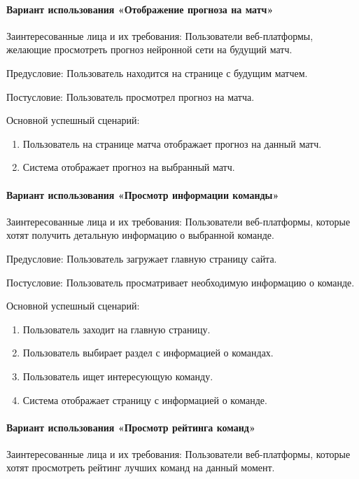 \paragraph{Вариант использования «Отображение прогноза на матч»}

Заинтересованные лица и их требования: Пользователи веб-платформы, желающие просмотреть прогноз нейронной сети на будущий матч.

Предусловие: Пользователь находится на странице с будущим матчем.

Постусловие: Пользователь просмотрел прогноз на матча.

Основной успешный сценарий:
\begin{enumerate}
	\item Пользователь на странице матча отображает прогноз на данный матч.
	\item Система отображает прогноз на выбранный матч.
\end{enumerate}

\paragraph{Вариант использования «Просмотр информации команды»}

Заинтересованные лица и их требования: Пользователи веб-платформы, которые хотят получить детальную информацию о выбранной команде.

Предусловие: Пользователь загружает главную страницу сайта.

Постусловие: Пользователь просматривает необходимую информацию о команде.

Основной успешный сценарий:
\begin{enumerate}
	\item Пользователь заходит на главную страницу.
	\item Пользователь выбирает раздел с информацией о командах.
	\item Пользователь ищет интересующую команду.
	\item Система отображает страницу с информацией о команде.
\end{enumerate}

\paragraph{Вариант использования «Просмотр рейтинга команд»}

Заинтересованные лица и их требования: Пользователи веб-платформы, которые хотят просмотреть рейтинг лучших команд на данный момент.


